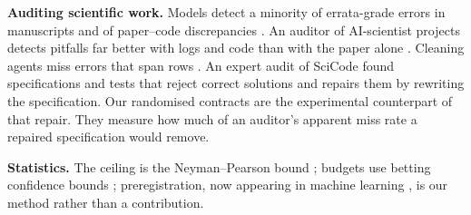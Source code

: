 \textbf{Auditing scientific work.} Models detect a minority of errata-grade errors in manuscripts
\citep{son2025spot} and of paper--code discrepancies \citep{baumgartner2026scicoqa}. An auditor of AI-scientist
projects detects pitfalls far better with logs and code than with the paper alone \citep{luo2025pitfalls}.
Cleaning agents miss errors that span rows \citep{bendinelli2025cleaning}. An expert audit of SciCode
\citep{tian2024scicode} found specifications and tests that reject correct solutions \citep{hu2026scicodeverified}
and repairs them by rewriting the specification. Our randomised contracts are the experimental counterpart
of that repair. They measure how much of an auditor's apparent miss rate a repaired specification would remove.

\textbf{Statistics.} The ceiling is the Neyman--Pearson bound \citep{neyman1933efficient}; budgets use betting
confidence bounds \citep{waudbysmith2024betting}; preregistration, now appearing in machine learning
\citep{vaccaro2026prereg, thomas2026phacking}, is our method rather than a contribution.
